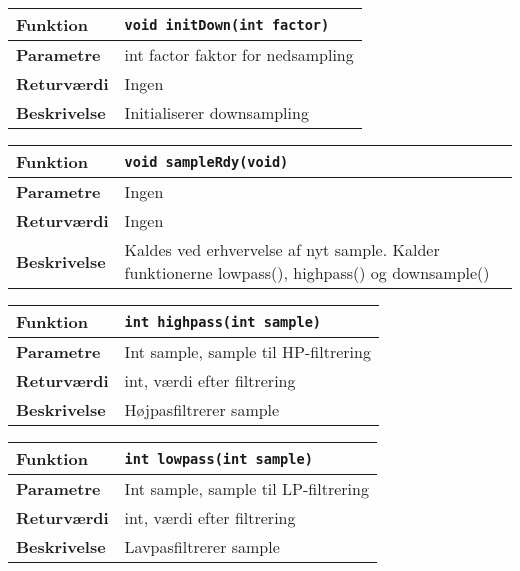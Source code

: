 \begin{center}
    \begin{tabular}{ | l | p{} |}
    \hline
    \textbf{Funktion}	& \verb+void initDown(int factor) +						\\ \hline
    \textbf{Parametre} 	& int factor faktor for nedsampling		\\ \hline
    \textbf{Returværdi}	& Ingen 								\\ \hline
    \textbf{Beskrivelse}	& Initialiserer downsampling		\\ \hline
    \end{tabular}
\end{center}

\begin{center}
    \begin{tabular}{ | l | p{} |}
    \hline
    \textbf{Funktion}	& \verb+void sampleRdy(void) +						\\ \hline
    \textbf{Parametre} 	& Ingen		\\ \hline
    \textbf{Returværdi}	& Ingen 								\\ \hline
    \textbf{Beskrivelse}	& Kaldes ved erhvervelse af nyt sample. Kalder funktionerne lowpass(), highpass() og downsample()		\\ \hline
    \end{tabular}
\end{center}

\begin{center}
    \begin{tabular}{ | l | p{} |}
    \hline
    \textbf{Funktion}	& \verb+int highpass(int sample) +						\\ \hline
    \textbf{Parametre} 	& Int sample, sample til HP-filtrering		\\ \hline
    \textbf{Returværdi}	& int, værdi efter filtrering 								\\ \hline
    \textbf{Beskrivelse}& Højpasfiltrerer sample		\\ \hline
    \end{tabular}
\end{center}

\begin{center}
    \begin{tabular}{ | l | p{} |}
    \hline
    \textbf{Funktion}	& \verb+int lowpass(int sample) +						\\ \hline
    \textbf{Parametre} 	& Int sample, sample til LP-filtrering		\\ \hline
    \textbf{Returværdi}	& int, værdi efter filtrering 								\\ \hline
    \textbf{Beskrivelse}& Lavpasfiltrerer sample		\\ \hline
    \end{tabular}
\end{center}


